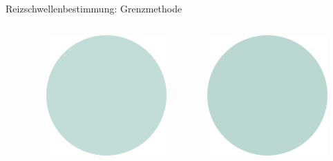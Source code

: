 \documentclass[aspectratio=169]{beamer}
\begin{document}
\begin{frame}{Reizschwellenbestimmung: Grenzmethode}
\begin{columns}[c]
\begin{column}{1cm}
\end{column}
\begin{column}{1cm}
\includegraphics[width=\textwidth]{reizschwelle_seriell_9.png}
\end{column}
\begin{column}{1cm}
\includegraphics[width=\textwidth]{reizschwelle_seriell_10.png}
\end{column}


\end{columns}



    
\end{frame}
\end{document}
